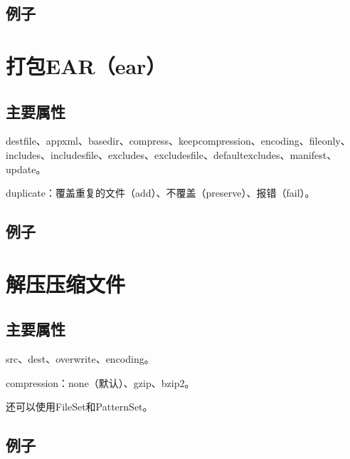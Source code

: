 \subsection{例子}










\section{打包EAR（ear）}


\subsection{主要属性}

destfile、appxml、basedir、compress、keepcompression、encoding、fileonly、includes、includesfile、excludes、excludesfile、defaultexcludes、manifest、update。

duplicate：覆盖重复的文件（add）、不覆盖（preserve）、报错（fail）。

\subsection{例子}










\section{解压压缩文件}

\subsection{主要属性}

src、dest、overwrite、encoding。

compression：none（默认）、gzip、bzip2。

还可以使用FileSet和PatternSet。

\subsection{例子}










